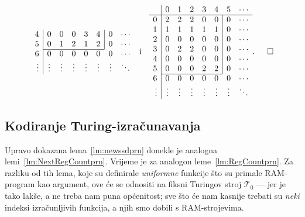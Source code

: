 \begin{primjer}[{name=[kodirana tablica prijelaza]}]
\begin{equation}
\begin{array}{r|ccccccc}
4& 0 & 0 & 0 & 3 & 4 & \multicolumn{1}{|c}{0} & \cdots\\
5& 0 & 1 & 2 & 1 & 2 & \multicolumn{1}{|c}{0} & \cdots\\ \cline{2-6}
6& 0 & 0 & 0 & 0 & 0 & 0 & \cdots\\
\vdots&\vdots&\vdots&\vdots&\vdots&\vdots&\vdots&\ddots
\end{array}\;\text{ i }\;\;
\begin{array}{r|ccccccc}
    &0&1&2&3&4&5&\cdots\\\hline
0& 2 & 2 & 2 & 0 & 0 & \multicolumn{1}{|c}{0} & \cdots\\
1& 1 & 1 & 1 & 1 & 1 & \multicolumn{1}{|c}{0} & \cdots\\
2& 0 & 0 & 0 & 0 & 0 & \multicolumn{1}{|c}{0} & \cdots\\
3& 0 & 2 & 2 & 0 & 0 & \multicolumn{1}{|c}{0} & \cdots\\
4& 0 & 0 & 0 & 0 & 0 & \multicolumn{1}{|c}{0} & \cdots\\
5& 0 & 0 & 0 & 2 & 2 & \multicolumn{1}{|c}{0} & \cdots\\ \cline{2-6}
6& 0 & 0 & 0 & 0 & 0 & 0 & \cdots\\
\vdots&\vdots&\vdots&\vdots&\vdots&\vdots&\vdots&\ddots
\end{array}\text.\!\!\!\qedhere
\end{equation}
\end{primjer}

\subsection{Kodiranje Turing-izračunavanja}

Upravo dokazana lema~\ref{lm:newssdprn} donekle je analogna lemi~\ref{lm:NextRegCountprn}. Vrijeme je za analogon leme~\ref{lm:RegCountprn}. Za razliku od tih lema, koje su definirale \emph{uniformne} funkcije što su primale RAM-program kao argument, ove će se odnositi na fiksni Turingov stroj $\mathcal T_0$ --- jer je tako lakše, a ne treba nam puna općenitost; sve što će nam kasnije trebati su \emph{neki} indeksi izračunljivih funkcija, a njih smo dobili s RAM-strojevima.

